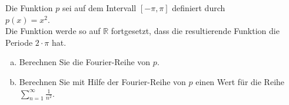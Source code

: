 \exercise
Die Funktion $p$ sei auf dem Intervall $[-\pi,\pi]$ definiert durch
\\[0.1cm]
\hspace*{1.3cm}
$p(x) = x^2$.
\\[0.1cm]
Die Funktion werde so auf $\mathbb{R}$ fortgesetzt, dass die resultierende Funktion die Periode
$2\!\cdot\!\pi$ hat.  
\begin{enumerate}[(a)]
\item Berechnen Sie die Fourier-Reihe von $p$.
\item Berechnen Sie mit Hilfe der Fourier-Reihe von $p$ einen Wert f\"ur die Reihe
      \\[0.3cm]
      \hspace*{1.3cm}
      $\displaystyle \sum\limits_{n=1}^\infty \frac{1}{n^2}$. \eox
\end{enumerate}



